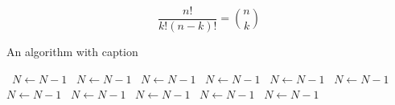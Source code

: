 \documentclass[a4paper]{article}
\begin{document}
\[ \frac{n!}{k!(n-k)!} = \binom{n}{k} \]

\begin{algorithm}
\caption{An algorithm with caption}
\begin{algorithmic}
\    \State $N \gets N - 1$
\    \State $N \gets N - 1$
\    \State $N \gets N - 1$
\    \State $N \gets N - 1$
\    \State $N \gets N - 1$
\    \State $N \gets N - 1$
\    \State $N \gets N - 1$
\    \State $N \gets N - 1$
\    \State $N \gets N - 1$
\    \State $N \gets N - 1$
\    \State $N \gets N - 1$
\EndWhile
\end{algorithmic}
\end{algorithm}
\end{document}
